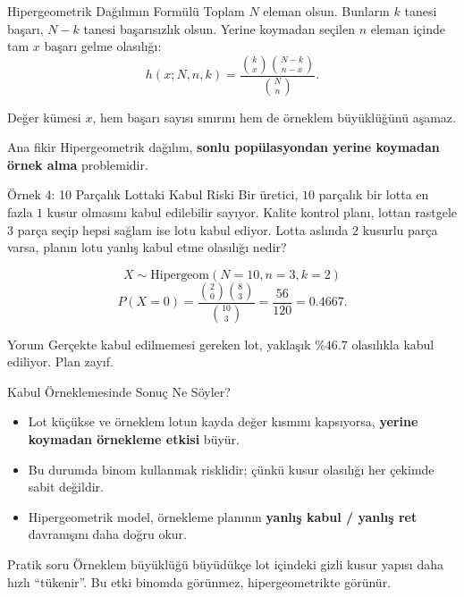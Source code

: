\documentclass[light]{lutbeamer}
\begin{document}
\begin{frame}{Hipergeometrik Dağılımın Formülü}
    \small
    Toplam \(N\) eleman olsun. Bunların \(k\) tanesi başarı, \(N-k\) tanesi başarısızlık olsun. Yerine koymadan seçilen \(n\) eleman içinde tam \(x\) başarı gelme olasılığı:
    \[
    h(x;N,n,k)=
    \frac{\binom{k}{x}\binom{N-k}{n-x}}{\binom{N}{n}}.
    \]

    \begin{block}{Değer kümesi}
        \(x\), hem başarı sayısı sınırını hem de örneklem büyüklüğünü aşamaz.
    \end{block}

    \begin{alertblock}{Ana fikir}
        Hipergeometrik dağılım, \textbf{sonlu popülasyondan yerine koymadan örnek alma} problemidir.
    \end{alertblock}
\end{frame}

\begin{frame}{Örnek 4: 10 Parçalık Lottaki Kabul Riski}
    \small
    Bir üretici, \(10\) parçalık bir lotta en fazla \(1\) kusur olmasını kabul edilebilir sayıyor. Kalite kontrol planı, lottan rastgele \(3\) parça seçip hepsi sağlam ise lotu kabul ediyor. Lotta aslında \(2\) kusurlu parça varsa, planın lotu yanlış kabul etme olasılığı nedir?

    \[
    X \sim \text{Hipergeom}(N=10,n=3,k=2)
    \]
    \[
    P(X=0)=\frac{\binom{2}{0}\binom{8}{3}}{\binom{10}{3}}=\frac{56}{120}=0.4667.
    \]

    \begin{alertblock}{Yorum}
        Gerçekte kabul edilmemesi gereken lot, yaklaşık \(\%46.7\) olasılıkla kabul ediliyor. Plan zayıf.
    \end{alertblock}
\end{frame}

\begin{frame}{Kabul Örneklemesinde Sonuç Ne Söyler?}
    \small
    \begin{itemize}
        \item Lot küçükse ve örneklem lotun kayda değer kısmını kapsıyorsa, \textbf{yerine koymadan örnekleme etkisi} büyür.
        \item Bu durumda binom kullanmak risklidir; çünkü kusur olasılığı her çekimde sabit değildir.
        \item Hipergeometrik model, örnekleme planının \textbf{yanlış kabul / yanlış ret} davranışını daha doğru okur.
    \end{itemize}

    \begin{block}{Pratik soru}
        Örneklem büyüklüğü büyüdükçe lot içindeki gizli kusur yapısı daha hızlı ``tükenir''. Bu etki binomda görünmez, hipergeometrikte görünür.
    \end{block}
\end{frame}
\end{document}
